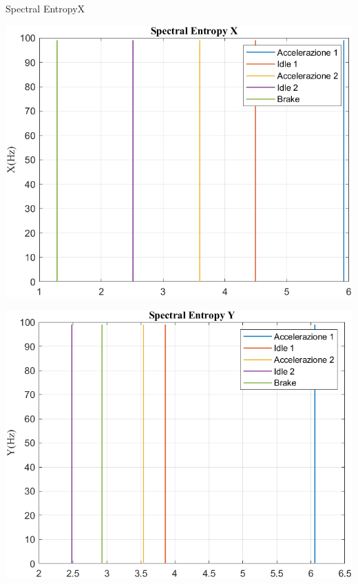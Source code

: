 \documentclass[beamer]{standalone}
\begin{document}
	\begin{frame}{{Spectral EntropyX}}
		\begin{minipage}{.45\textwidth}
			\centering\includegraphics[width=.9\textwidth]{figure/Vel/Trasformata/Spectral EntropyX}
		\end{minipage}
		\hspace{.05\textwidth}
		\begin{minipage}{.45\textwidth}
			\centering\includegraphics[width=.9\textwidth]{figure/Vel/Trasformata/Spectral EntropyY}
		\end{minipage}
	\end{frame}
	
\end{document}
